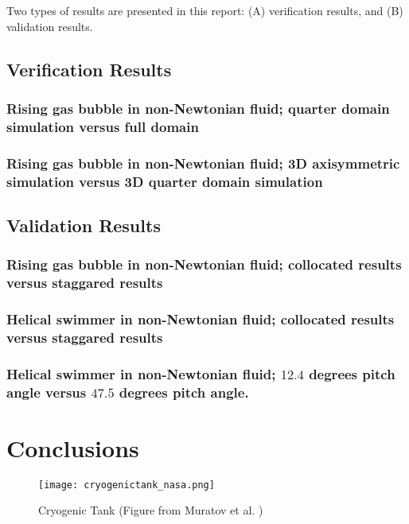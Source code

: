 \documentclass[]{article}
\begin{document}
Two types of results are presented in this report: (A) verification results, 
and (B) validation results.

\subsection*{Verification Results} 

\subsubsection*{Rising gas bubble in non-Newtonian fluid; quarter
 domain simulation versus full domain} 

\subsubsection*{Rising gas bubble in non-Newtonian fluid; 3D 
 axisymmetric simulation versus 3D quarter domain simulation}

\subsection*{Validation Results} 

\subsubsection*{Rising gas bubble in non-Newtonian fluid; collocated
 results versus staggared results}

\subsubsection*{Helical swimmer in non-Newtonian fluid; collocated
 results versus staggared results}

\subsubsection*{Helical swimmer in non-Newtonian fluid; 
 $12.4$ degrees pitch angle versus $47.5$ degrees pitch angle.}

\section*{Conclusions} 

\begin{figure}[h]
\centering
\texttt{[image: cryogenictank\_nasa.png]}
\caption*{Cryogenic Tank (Figure from Muratov et al. \cite{Muratov2011})}
\end{figure}
\end{document}
